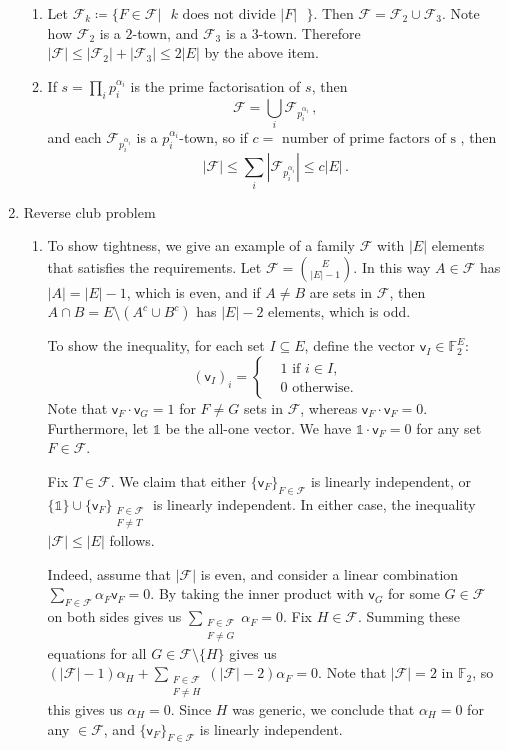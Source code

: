 \documentclass[kulak]{tplt}
\theoremstyle{definition}
\newcommand{\F}{\mathbb{F}}
\newcommand{\FF}{\mathcal F}
\newcommand{\vv}{\mathsf{v}}
\begin{document}
\begin{enumerate}
\begin{enumerate}
\item 
Let $\FF_k \coloneqq \{F \in \FF | \text{ $k$ does not divide $|F|$ } \}$.
Then $\FF = \FF_2 \cup \FF_3$.
Note how $\FF_2$ is a $2$-town, and $\FF_3$ is a $3$-town.
Therefore $|\FF| \leq |\FF_2| + |\FF_3| \leq 2|E|$ by the above item.


\item
If $s = \prod_i p_i^{\alpha_i}$ is the prime factorisation of $s$, then 
$$ \FF = \bigcup_i \FF_{p_i^{\alpha_i}}\, , $$
and each $\FF_{p_i^{\alpha_i}}$ is a $p_i^{\alpha_i}$-town, so if $c = \text{ number of prime factors of s }$, then
$$|\FF | \leq \sum_i |\FF_{p_i^{\alpha_i}}| \leq c |E| \, . $$
\end{enumerate}


\item Reverse club problem

\begin{enumerate}
\item 
To show tightness, we give an example of a family $\FF$ with $|E|$ elements that satisfies the requirements.
Let $\FF = \binom{E}{|E| - 1}$.
In this way $A \in \FF $ has $|A| = |E| - 1$, which is even, and if $A\neq B $ are sets in $\FF$, then $A\cap B = E\setminus (A^c \cup B^c) $ has $|E| - 2$ elements, which is odd.

To show the inequality, for each set $I \subseteq E$, define the vector $\vv_I \in \F_2^E$:
$$ (\vv_I)_i =\begin{cases*}
      & 1 \text{ if $i \in I$,}\\
      & 0 \text{ otherwise.}
    \end{cases*} $$
Note that $\vv_F \cdot \vv_G = 1$ for $F\neq G$ sets in $\FF$, whereas $\vv_F \cdot \vv_F = 0$.
Furthermore, let $\mathbb{1} $ be the all-one vector.
We have $\mathbb{1} \cdot \vv_F = 0$ for any set $F \in \FF$.


Fix $T \in \FF$.
We claim that either $\{\vv_F\}_{F \in \FF}$ is linearly independent, or $\{\mathbb{1}\} \cup \{\vv_F\}_{\substack{F \in \FF \\ F \neq T}}$ is linearly independent.
In either case, the inequality $|\FF| \leq |E|$ follows.

Indeed, assume that $|\FF|$ is even, and consider a linear combination $\sum_{F\in \FF} \alpha_F \vv_F = 0$.
By taking the inner product with $\vv_G$ for some $G\in \FF$ on both sides gives us $\sum_{\substack{F\in \FF\\ F \neq G}} \alpha_F = 0$.
Fix $H \in \FF$.
Summing these equations for all $G \in\FF \setminus \{H \}$ gives us $(|\FF| - 1 ) \alpha_H +  \sum_{\substack{F \in \FF \\ F \neq H}} (|\FF| - 2 ) \alpha_F = 0$.
Note that $|\FF| = 2 $ in $\F_2$, so this gives us $\alpha_H  = 0$.
Since $H$ was generic, we conclude that $\alpha_H =0 $ for any $\in \FF$, and $\{\vv_F\}_{F \in \FF}$ is linearly independent.


\end{enumerate}
\end{enumerate}
\end{document}
